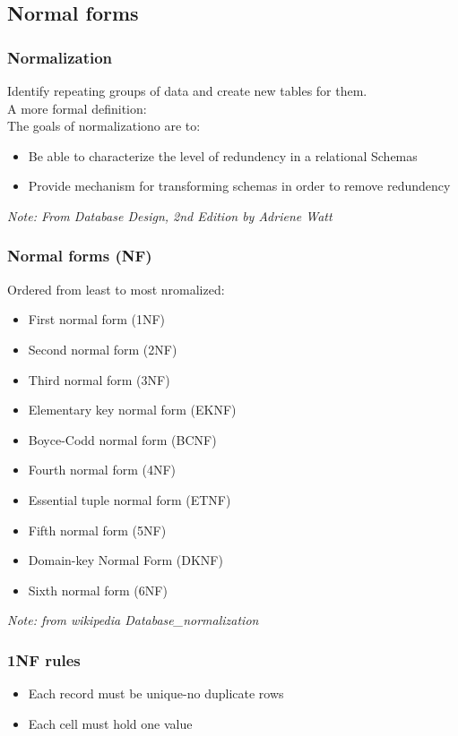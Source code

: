 \subsection{Normal forms}
\subsubsection{Normalization}
Identify repeating groups of data and create new tables for them. \\
A more formal definition: \\
The goals of normalizationo are to:
\begin{itemize}
    \item Be able to characterize the level of redundency in a relational Schemas
    \item Provide mechanism for transforming schemas in order to remove redundency
\end{itemize}
\emph{Note: From Database Design, 2nd Edition by Adriene Watt}

\subsubsection{Normal forms (NF)}
Ordered from least to most nromalized:
\begin{itemize}
    \item First normal form (1NF)
    \item Second normal form (2NF)
    \item Third normal form (3NF)
    \item Elementary key normal form (EKNF)
    \item Boyce-Codd normal form (BCNF)
    \item Fourth normal form (4NF)
    \item Essential tuple normal form (ETNF)
    \item Fifth normal form (5NF)
    \item Domain-key Normal Form (DKNF)
    \item Sixth normal form (6NF)
\end{itemize}
\emph{Note: from wikipedia Database\_normalization}

\subsubsection{1NF rules}
\begin{itemize}
    \item Each record must be unique-no duplicate rows
    \item Each cell must hold one value
\end{itemize}


